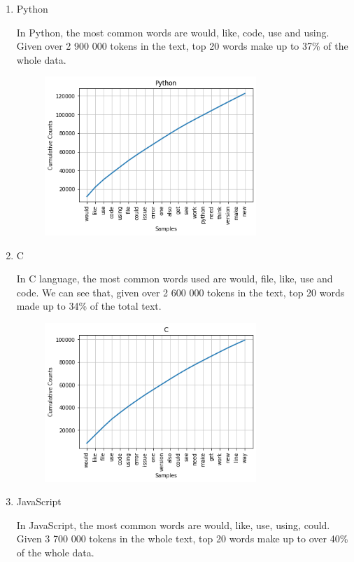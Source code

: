 \documentclass[]{article}
\begin{document}
\begin{enumerate}

    \item Python

          In Python, the most common words are would, like, code, use and using. Given over 2 900 000 tokens in the text, top 20 words make up to 37\% of the whole data.

          \begin{figure}[H]
              \includegraphics[width=8cm]{freq_Python.png}
              \centering
          \end{figure}

    \item C

          In C language, the most common words used are would, file, like, use and code. We can see that, given over 2 600 000 tokens in the text, top 20 words made up to 34\% of the total text.

          \begin{figure}[H]
              \includegraphics[width=8cm]{freq_C.png}
              \centering
          \end{figure}

    \item JavaScript

          In JavaScript, the most common words are would, like, use, using, could. Given 3 700 000 tokens in the whole text, top 20 words make up to over 40\% of the whole data.


\end{enumerate}
\end{document}
